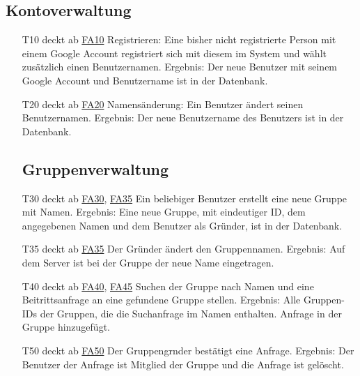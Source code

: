 \documentclass{scrartcl}
\begin{document}
	\subsection{Kontoverwaltung}
	\begin{itemize} 
		\item[T10] deckt ab \hyperlink{FA10}{FA10} \newline
		Registrieren: Eine bisher nicht registrierte Person mit einem Google Account registriert sich mit diesem im System 				und wählt zusätzlich einen Benutzernamen. \newline
		Ergebnis: Der neue Benutzer mit seinem Google Account und Benutzername ist in der Datenbank.

		\item[T20] deckt ab \hyperlink{FA20}{FA20}\newline
		Namensänderung: Ein Benutzer ändert seinen Benutzernamen. \newline
		Ergebnis: Der neue Benutzername des Benutzers ist in der Datenbank. 
	
	\subsection{Gruppenverwaltung}
	
		\item[T30] deckt ab \hyperlink{FA30}{FA30}, \hyperlink{FA35}{FA35}\newline
		 Ein beliebiger Benutzer erstellt eine neue Gruppe mit Namen. \newline
		Ergebnis: Eine neue Gruppe, mit eindeutiger ID, dem angegebenen Namen und dem Benutzer als Gründer, ist in der 			Datenbank.

		\item[T35] deckt ab \hyperlink{FA35}{FA35} \newline
		Der Gründer ändert den Gruppennamen.\newline
		Ergebnis: Auf dem \gls{Server} ist bei der Gruppe der neue Name eingetragen. 

		\item[T40] deckt ab \hyperlink{FA40}{FA40}, \hyperlink{FA45}{FA45}  \newline
		Suchen der Gruppe nach Namen und eine Beitrittsanfrage an eine gefundene Gruppe stellen. \newline
		Ergebnis: Alle Gruppen-IDs der Gruppen, die die Suchanfrage im Namen enthalten. Anfrage in der Gruppe 		
		hinzugefügt.

		\item[T50] deckt ab \hyperlink{FA50}{FA50}  \newline
		Der \gls{Gruppengrnder} bestätigt eine Anfrage. \newline
		Ergebnis: Der Benutzer der Anfrage ist \gls{Mitglied} der Gruppe und die Anfrage ist gelöscht.


\end{itemize}
\end{document}
